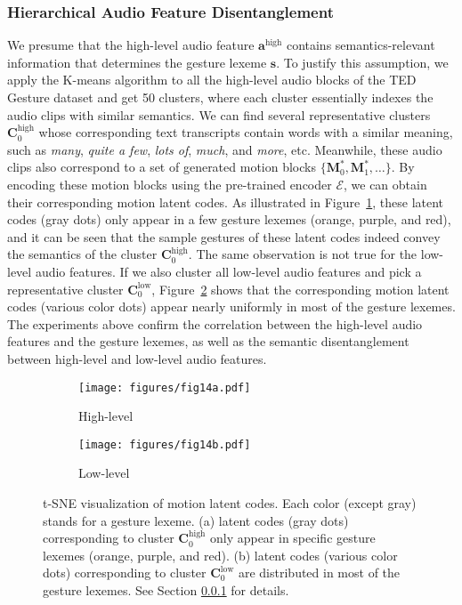 \documentclass[acmtog,authorversion]{acmart}
\newcommand{\vect}[1]{\bm{#1}}
\newcommand{\eqword}[1]{{\text{#1}}}
\newcommand{\fig}{Figure{}~}
\begin{document}
\subsubsection{Hierarchical Audio Feature Disentanglement}
\label{subsubsec:disentanglement}
We presume that the high-level audio feature $\vect{a}^{\eqword{high}}$ contains semantics-relevant information that determines the gesture lexeme $\vect{s}$.
To justify this assumption, we apply the K-means algorithm to all the high-level audio blocks of the TED Gesture dataset and get 50 clusters, where each cluster essentially indexes the audio clips with similar semantics. We can find several representative clusters $\vect{C}^{\eqword{high}}_0$ whose corresponding text transcripts contain words with a similar meaning, such as \emph{many}, \emph{quite a few}, \emph{lots of}, \emph{much}, and \emph{more}, etc. Meanwhile, these audio clips also correspond to a set of generated motion blocks $\{\vect{M}^*_0,\vect{M}^*_1,\dots\}$. By encoding these motion blocks using the pre-trained encoder $\mathcal{E}$, we can obtain their corresponding motion latent codes. As illustrated in \fig\ref{fig:fig14a}, these latent codes (gray dots) only appear in a few gesture lexemes (orange, purple, and red), and it can be seen that the sample gestures of these latent codes indeed convey the semantics of the cluster $\vect{C}^{\eqword{high}}_0$.
The same observation is not true for the low-level audio features. If we also cluster all low-level audio features and pick a representative cluster $\vect{C}^{\eqword{low}}_0$, \fig\ref{fig:fig14b} shows that the corresponding motion latent codes (various color dots) appear nearly uniformly in most of the gesture lexemes.
The experiments above confirm the correlation between the high-level audio features and the gesture lexemes, as well as the semantic disentanglement between high-level and low-level audio features.

\begin{figure}[t]
    \centering
    \begin{subfigure}[t]{0.62\linewidth}
        \centering
        \texttt{[image: figures/fig14a.pdf]}
        \caption{High-level}
        \label{fig:fig14a}
    \end{subfigure} 
    \hspace{\fill}
    \begin{subfigure}[t]{0.3554\linewidth}
        \centering
        \texttt{[image: figures/fig14b.pdf]}
        \caption{Low-level}
        \label{fig:fig14b}
    \end{subfigure} 
    \caption{t-SNE visualization of motion latent codes. Each color (except gray) stands for a gesture lexeme. 
    (a) latent codes (gray dots) corresponding to cluster $\vect{C}^{\eqword{high}}_0$ only appear in specific gesture lexemes (orange, purple, and red).
    (b) latent codes (various color dots) corresponding to cluster $\vect{C}^{\eqword{low}}_0$ are distributed in most of the gesture lexemes.
    See Section \ref{subsubsec:disentanglement} for details.}
    \label{fig:fig14}
    \Description{}
\end{figure}
\end{document}
